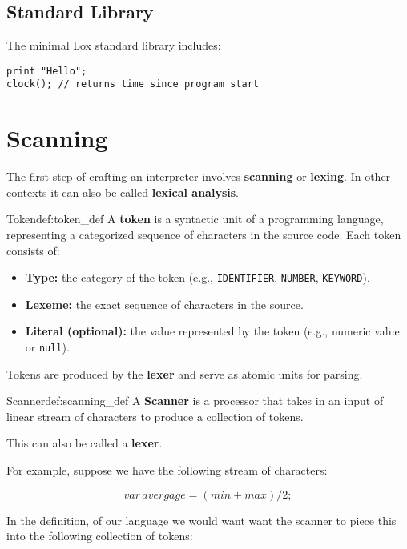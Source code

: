 \documentclass[12pt,a4paper]{article}
\begin{document}
\subsection{Standard Library}

The minimal Lox standard library includes:

\begin{lstlisting}
print "Hello";
clock(); // returns time since program start
\end{lstlisting}



\section{Scanning}
The first step of crafting an interpreter involves \textbf{scanning} or \textbf{lexing}. In other contexts it can also be called \textbf{lexical analysis}.


\begin{definition}{Token}{def:token_def}\label{def:token_def}
	A \textbf{token} is a syntactic unit of a programming language, representing a categorized sequence of characters in the source code. Each token consists of:
	\begin{itemize}
		\item \textbf{Type:} the category of the token (e.g., \texttt{IDENTIFIER}, \texttt{NUMBER}, \texttt{KEYWORD}).
		\item \textbf{Lexeme:} the exact sequence of characters in the source.
		\item \textbf{Literal (optional):} the value represented by the token (e.g., numeric value or \texttt{null}).
	\end{itemize}
	Tokens are produced by the \textbf{lexer} and serve as atomic units for parsing.
\end{definition}

\begin{definition}{Scanner}{def:scanning_def}\label{scanner_def}
	A \textbf{Scanner} is a processor that takes in an input of linear stream of characters to produce a collection of tokens.
\end{definition}

This can also be called a \textbf{lexer}.

For example, suppose we have the following stream of characters:

\[var \, avergage = (min + max) / 2 ;\]

In the definition, of our language we would want want the scanner to piece this into the following collection of tokens:
\end{document}
